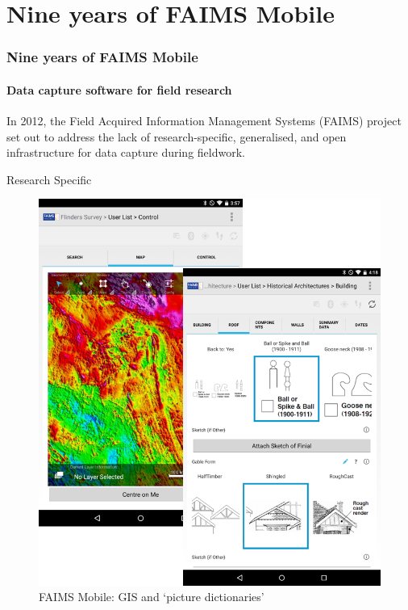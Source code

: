 
\section{Nine years of FAIMS Mobile}

\begin{sectionframe} %
	\frametitle{Nine years of FAIMS Mobile}
	\framesubtitle{Data capture software for field research}

    \vfill
    
In 2012, the Field Acquired Information Management Systems (FAIMS) project set out to address the lack of research-specific, generalised, and open infrastructure for data capture during fieldwork.

\end{sectionframe}



\begin{frame}{Research Specific}
 \begin{figure}[H]
    \centering
    \vspace{-0.5cm}
        \includegraphics[height=.75\textheight]{figures/FAIMS-screenshots.png}
        \caption{FAIMS Mobile: GIS and `picture dictionaries'}
        \label{fig:FAIMS-mobile-screenshots}
 \end{figure}
\end{frame}

